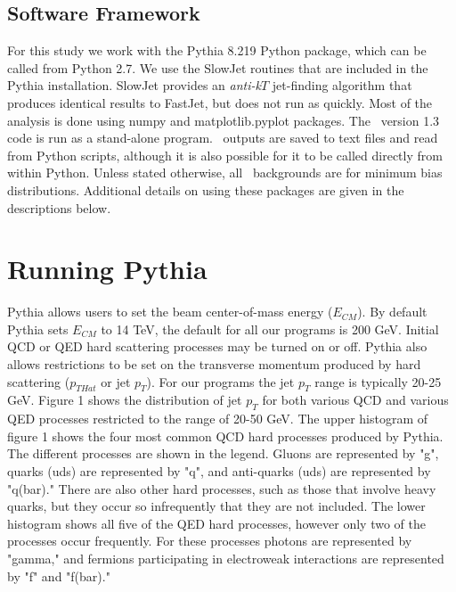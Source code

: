 \documentclass[11pt]{article}
\begin{document}
\subsection*{Software Framework}

For this study we work with the Pythia 8.219 Python package, which can be called from Python 2.7.  We use the SlowJet routines that are included in the Pythia installation.  SlowJet provides an {\it anti-k$T$} jet-finding algorithm that produces identical results to FastJet, but does not run as quickly.  Most of the analysis is done using numpy and matplotlib.pyplot packages.  The \trento\ version 1.3 code is run as a stand-alone program.  \trento\ outputs are saved to text files and read from Python scripts, although it is also possible for it to be called directly from within Python.  Unless stated otherwise, all \trento\ backgrounds are for minimum bias distributions.  Additional details on using these packages are given in the descriptions below.

\section{Running Pythia}
%
%
Pythia allows users to set the beam center-of-mass energy ($E_{CM}$). By default Pythia sets $E_{CM}$ to 14 TeV, the default for all our programs is 200 GeV.  Initial QCD or QED hard scattering processes may be turned on or off. Pythia also allows restrictions to be set on the transverse momentum produced by hard scattering ($p_{THat}$ or jet $p_T$). For our programs the jet $p_T$ range is typically 20-25 GeV. Figure 1 shows the distribution of jet $p_T$ for both various QCD and various QED processes restricted to the range of 20-50 GeV. The upper histogram of figure 1 shows the four most common QCD hard processes produced by Pythia. The different processes are shown in the legend. Gluons are represented by "g", quarks (uds) are represented by "q", and anti-quarks (uds) are represented by "q(bar)." There are also other hard processes, such as those that involve heavy quarks, but they occur so infrequently that they are not included. The lower histogram shows all five of the QED hard processes, however only two of the processes occur frequently. For these processes photons are represented by "gamma," and fermions participating in electroweak interactions are represented by "f" and "f(bar)."
\end{document}
